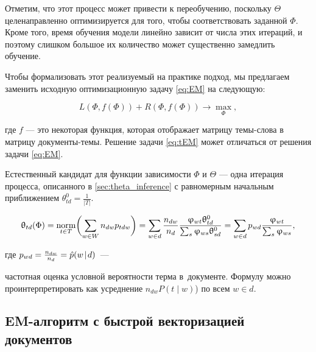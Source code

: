 Отметим, что этот процесс может привести к переобучению, поскольку $\Theta$ целенаправленно оптимизируется для того, чтобы соответствовать заданной $\Phi$. Кроме того, время обучения модели линейно зависит от числа этих итераций, и поэтому слишком большое их количество может существенно замедлить обучение.  

Чтобы формализовать этот реализуемый на практике подход, мы предлагаем заменить исходную оптимизационную задачу \ref{eq:EM} на следующую: 

\begin{equation} \label{eq:tEM} 

L(\Phi, f(\Phi) ) + R(\Phi, f(\Phi) ) \to \max_{\Phi}, 

\end{equation} 

где $f$ --- это некоторая функция, которая отображает матрицу темы-слова в матрицу документы-темы. Решение задачи \ref{eq:tEM} может отличаться от решения задачи \ref{eq:EM}.  

Естественный кандидат для функции зависимости $\Phi$ и $\Theta$ --- одна итерация процесса, описанного в \ref{sec:theta_inference} с равномерным начальным приближением $\theta^0_{td} = \frac1{|T|}$.  

\begin{equation} 
\label{eq:thetaform} 
    \uptheta_{td}(\Phi) 
    = \mathop{\mathrm{norm}}\limits_{t\in T} \biggl( \sum_{w\in W} n_{dw} p_{tdw} \biggr) 
    = \sum_{w\in d} \frac{n_{dw}}{n_d} \frac{\upvarphi_{wt} \uptheta^0_{td}}{\sum_s \upvarphi_{ws} \uptheta^0_{sd}} 
    = \sum_{w\in d} p_{wd} \frac{\upvarphi_{wt}}{\sum_s \upvarphi_{ws}}, 
\end{equation} 

где $p_{wd} = \frac{n_{dw}}{n_d} = \hat p(w\mspace{2mu}{|}\mspace{2mu} d)$~--- 

частотная оценка условной вероятности терма в~документе. Формулу можно проинтерпретировать как усреднение $n_{dw} P(t \mid w)$) по всем $w \in d$.  

\subsection{EM-алгоритм с быстрой векторизацией документов} 

